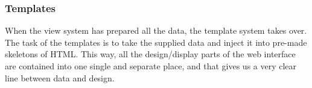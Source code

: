 \subsubsection{Templates}

When the view system has prepared all the data, the template system takes over.
The task of the templates is to take the supplied data and inject it into
pre-made skeletons of HTML. This way, all the design/display parts of the
web interface are contained into one single and separate place, and that gives
us a very clear line between data and design.
